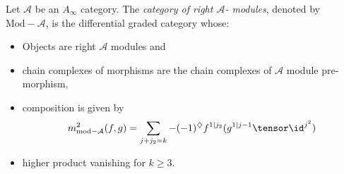 
 
 
Let $\mathcal A$ be  an \emph{$A_\infty$} category. The \emph{category of right $\mathcal A$- modules}, denoted by $\text{Mod}-\mathcal A$, is the differential graded category whose: 
\begin{itemize}
    \item Objects are right $\mathcal A$ modules and
    \item chain complexes of morphisms are the chain complexes of $\mathcal A$ module pre-morphism,
    \item composition is given by 
    \[m^2_{\text{mod}-\mathcal A}(f, g)=\sum_{j+j_2=k}-(-1)^\diamondsuit f^{1|j_2}(g^{1|j-1}\tensor \id^{j^2})\]
    \item higher product vanishing for $k\geq 3.$
\end{itemize}
 
